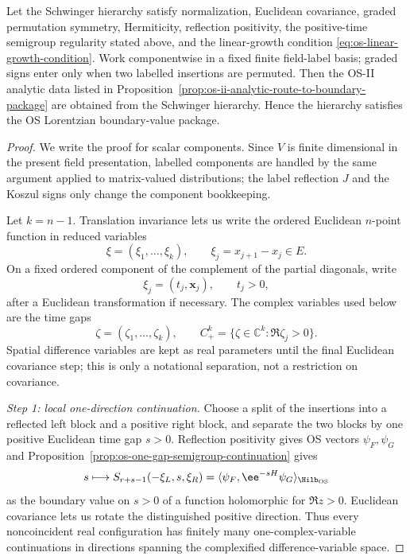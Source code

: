 \begin{theorem}
\label{thm:corrected-os-ii-analytic-theorem}
Let the Schwinger hierarchy satisfy normalization, Euclidean covariance,
graded permutation symmetry, Hermiticity, reflection positivity, the
positive-time semigroup regularity stated above, and the linear-growth
condition \eqref{eq:os-linear-growth-condition}.  Work componentwise in a
fixed finite field-label basis; graded signs enter only when two labelled
insertions are permuted.  Then the OS-II analytic data listed in
Proposition~\ref{prop:os-ii-analytic-route-to-boundary-package} are obtained
from the Schwinger hierarchy.  Hence the hierarchy satisfies the OS
Lorentzian boundary-value package.
\end{theorem}

\begin{proof}
We write the proof for scalar components.  Since \(V\) is finite dimensional in
the present field presentation, labelled components are handled by the same
argument applied to matrix-valued distributions; the label reflection \(J\) and
the Koszul signs only change the component bookkeeping.

Let \(k=n-1\).  Translation invariance lets us write the ordered Euclidean
\(n\)-point function in reduced variables
\[
  \xi=(\xi_1,\ldots,\xi_k),\qquad
  \xi_j=x_{j+1}-x_j\in E .
\]
On a fixed ordered component of the complement of the partial diagonals, write
\[
  \xi_j=(t_j,\mathbf x_j),\qquad t_j>0 ,
\]
after a Euclidean transformation if necessary.  The complex variables used
below are the time gaps
\[
  \zeta=(\zeta_1,\ldots,\zeta_k),\qquad
  C_+^k=\{\zeta\in\mathbb C^k:\Re\zeta_j>0\}.
\]
Spatial difference variables are kept as real parameters until the final
Euclidean covariance step; this is only a notational separation, not a
restriction on covariance.

\emph{Step 1: local one-direction continuation.}
Choose a split of the insertions into a reflected left block and a positive
right block, and separate the two blocks by one positive Euclidean time gap
\(s>0\).  Reflection positivity gives OS vectors \(\psi_F,\psi_G\) and
Proposition~\ref{prop:os-one-gap-semigroup-continuation} gives
\[
  s\longmapsto
  S_{r+s-1}(-\xi_L,s,\xi_R)
  =
  \langle \psi_F,\ee^{-sH}\psi_G\rangle_{\Hilb_{\rm OS}}
\]
as the boundary value on \(s>0\) of a function holomorphic for
\(\Re z>0\).  Euclidean covariance lets us rotate the distinguished positive
direction.  Thus every noncoincident real configuration has finitely many
one-complex-variable continuations in directions spanning the complexified
difference-variable space.


\end{proof}
